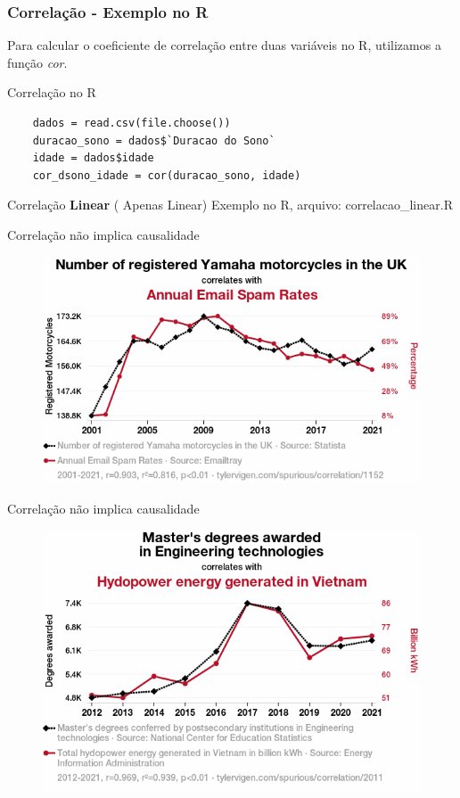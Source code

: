 \begin{frame}[fragile]
\frametitle{Correlação - Exemplo no R}   
    Para calcular o coeficiente de correlação entre duas variáveis no R, utilizamos a função \textit{cor}.
    \begin{block}{Correlação no R}
    \begin{verbatim}
    dados = read.csv(file.choose())
    duracao_sono = dados$`Duracao do Sono`
    idade = dados$idade
    cor_dsono_idade = cor(duracao_sono, idade)
    \end{verbatim}
    \end{block}
\end{frame}

\begin{frame}{Correlação \textbf{Linear} ( Apenas Linear)}
    Exemplo no R, arquivo: correlacao\_linear.R
\end{frame}

\begin{frame}{Correlação não implica causalidade}
    \begin{figure}
        \centering
        \includegraphics[width=0.8\linewidth]{figures/1152_number-of-registered-yamaha-motorcycles-in-the-uk_correlates-with_annual-email-spam-rates.png}
    \end{figure}
\end{frame}


\begin{frame}{Correlação não implica causalidade}
    \begin{figure}
        \centering
        \includegraphics[width=0.8\linewidth]{figures/2011_masters-degrees-awarded-in-engineering-technologies_correlates-with_hydopower-energy-generated-in-vietnam.png}
    \end{figure}
\end{frame}


